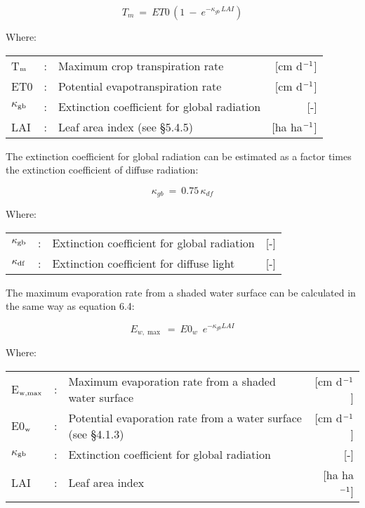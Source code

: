 \begin{equation}
T _{m} ~=~ ET0\, (1~-~e ^{-\kappa _{gb} \, LAI} )
\end{equation}
 
Where:\\
\begin{tabularx}{\textwidth}{llXr}
T$_{{\rm m}}$ &:& Maximum crop transpiration rate & [cm d$^{{\rm -1}}$]\\
ET0 &:& Potential evapotranspiration rate & [cm d$^{{\rm -1}}$]\\
$\kappa$$_{{\rm gb}}$ &:& Extinction coefficient for global radiation & [-]\\
LAI &:& Leaf area index (see \S 5.4.5) & [ha ha$^{{\rm -1}}$]\\
\end{tabularx}

The extinction coefficient for global radiation can be estimated as a factor times the
extinction coefficient of diffuse radiation:

\begin{equation}
\kappa_{gb} ~=~ 0.75\, \kappa_{df} 
\end{equation}

Where:\\
\begin{tabularx}{\textwidth}{llXr}
$\kappa_{{\rm gb}}$ &:& Extinction coefficient for global radiation & [-]\\
$\kappa_{{\rm df}}$ &:& Extinction coefficient for diffuse light & [-]\\
\end{tabularx}

The maximum evaporation rate from a shaded water surface can be calculated in the same
way as equation 6.4: 

\begin{equation}
E _{w,\max } ~=~ E0 _{w} \,\,\, e ^{-\kappa  _{gb} LAI}
\end{equation}

Where:\\
\begin{tabularx}{\textwidth}{llXr}
E$_{{\rm w,max}}$ &:& Maximum evaporation rate from a shaded water surface & [cm d$^{{\rm -1}}$]\\
E0$_{{\rm w}}$ &:& Potential evaporation rate from a water surface (see \S 4.1.3) & [cm d$^{{\rm -1}}$]\\
$\kappa$$_{{\rm gb}}$ &:& Extinction coefficient for global radiation & [-]\\
LAI &:& Leaf area index & [ha ha$^{{\rm -1}}$]\\
\end{tabularx}

